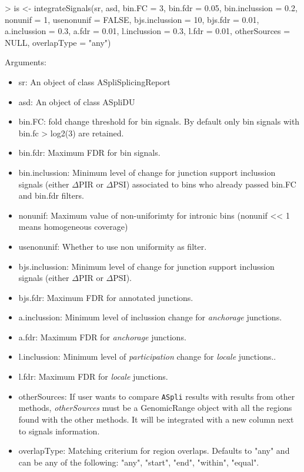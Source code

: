 \documentclass{article}
\begin{document}
\begin{Schunk}
\begin{Sinput}
> is    <- integrateSignals(sr, asd,
                  bin.FC = 3, bin.fdr = 0.05, bin.inclussion = 0.2,
                  nonunif = 1, usenonunif = FALSE, 
                  bjs.inclussion = 10, bjs.fdr = 0.01, 
                  a.inclussion   = 0.3, a.fdr = 0.01, 
                  l.inclussion   = 0.3, l.fdr = 0.01,
                  otherSources = NULL, overlapType = "any")
\end{Sinput}
\end{Schunk}

Arguments:
\begin{itemize}
\item sr: An object of class ASpliSplicingReport
\item asd: An object of class ASpliDU
\item bin.FC: fold change threshold for bin signals. By default only bin signals with bin.fc > log2(3) are retained.
\item bin.fdr: Maximum FDR for bin signals.
\item bin.inclussion: Minimum level of change for junction support inclussion signals (either $\Delta$PIR or $\Delta$PSI) associated to bins who already passed bin.FC and bin.fdr filters.
\item nonunif: Maximum value of non-uniforimty for intronic bins (nonunif << 1 means homogeneous coverage)
\item usenonunif: Whether to use non uniformity as filter.
\item bjs.inclussion: Minimum level of change for junction support inclussion signals (either $\Delta$PIR or $\Delta$PSI).
\item bjs.fdr: Maximum FDR for annotated junctions.
\item a.inclussion:  Minimum level of inclussion change for {\em anchorage} junctions.
\item a.fdr: Maximum FDR for {\em anchorage} junctions.
\item l.inclussion: Minimum level of {\em participation} change for {\em locale} junctions..
\item l.fdr: Maximum FDR for {\em locale} junctions.
\item otherSources: If user wants to compare \texttt{ASpli} results with results from other methods, {\em otherSources} must be a GenomicRange object with all the regions found with the other methods. It will be integrated with a new column next to signals information.
\item overlapType: Matching criterium for region overlaps. Defaults to "any" and can be any of the following: "any", "start", "end", "within", "equal".
\end{itemize}
\end{document}

